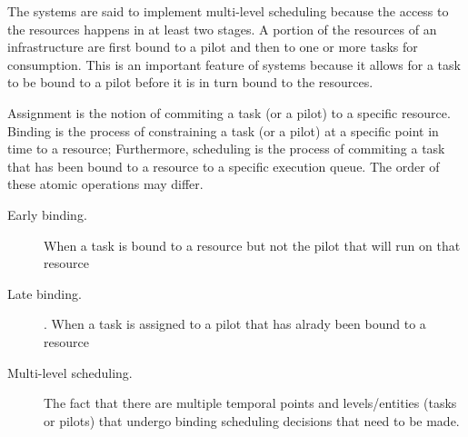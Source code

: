 \documentclass{sig-alternate}
\begin{document}
The \pilotjob systems are said to implement multi-level scheduling 
because the access to the resources happens in at least two stages. A 
portion of the resources of an infrastructure are first bound to a 
pilot and then to one or more tasks for consumption. This is an important 
feature of \pilotjob systems because it allows for a task to be 
bound to a pilot before it is in turn bound to the resources.





 Assignment is the notion of commiting a task (or
a pilot) to a specific resource. Binding is the process of
constraining a task (or a pilot) at a specific point in time to a
resource; Furthermore, scheduling is the process of commiting a task
that has been bound to a resource to a specific execution queue. The
order of these atomic operations may differ.

\begin{description}
  \item[Early binding.] When a task is bound to a resource but not
    the pilot that will run on that resource
  \item[Late binding.] . When a task is assigned to a pilot that has
    alrady been bound to a resource
  \item[Multi-level scheduling.] The fact that there are multiple
    temporal points and levels/entities (tasks or pilots) that undergo
    binding scheduling decisions that need to be made. 
\end{description}

\end{document}

